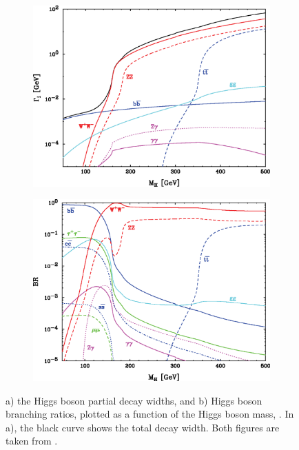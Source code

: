 \begin{figure}[tbph]
\centering
    \begin{subfigure}[b]{0.45\textwidth}
        \includegraphics[width=\textwidth]{theory/HiggsDecayWidth}
        \caption{}
        \label{fig:theoryHiggsDecayWidth}
    \end{subfigure}
    \begin{subfigure}[b]{0.45\textwidth}
        \includegraphics[width=\textwidth]{theory/HiggsBranchingRatio}
        \caption{}
        \label{fig:theoryHiggsBranchingRatio}
    \end{subfigure}
\caption[SM Higgs boson decay width and branching ratios]%
{a) the Higgs boson partial decay widths, and b) Higgs boson branching ratios, plotted as a function of the Higgs boson mass, \Hmass. In a), the black curve shows the total decay width. Both figures are taken from \cite{Rainwater:2007cp}.}
\label{fig:theoryHiggsPhenomenology}
\end{figure}


